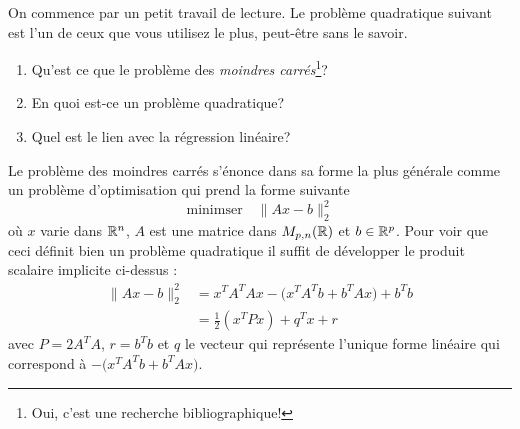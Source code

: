 \documentclass[11pt, a4paper]{article}
\begin{document}
On commence par un petit travail de lecture. Le problème quadratique
suivant est l'un de ceux que vous utilisez le plus, peut-être sans le
savoir.
\begin{question}
  \begin{enumerate}
  \item Qu'est ce que le problème des \textit{moindres carrés}\footnote{Oui,
    c'est une recherche bibliographique!}? 
  \item En quoi est-ce un problème quadratique?
  \item Quel est le lien avec la régression linéaire?
  \end{enumerate}
\end{question}

\begin{solution}
  Le problème des moindres carrés s'énonce dans sa forme la plus
  générale comme un problème d'optimisation qui prend la forme
  suivante
  \[
  \textrm{minimser}\quad \|Ax - b\|_2^2
  \]
  où $x$ varie dans $\mathbb{R}^n$, $A$ est une matrice dans $M_{p, n}(\mathbb{R})$ et
  $b \in \mathbb{R}^p$. Pour voir que ceci définit bien un problème
  quadratique il suffit de développer le produit scalaire implicite
  ci-dessus :
  \begin{align}
    \|Ax - b\|_2^2 & = x^TA^TAx - \big(x^TA^Tb + b^TAx) + b^Tb \\
                   & = \frac{1}{2}(x^TPx) +  q^Tx + r
  \end{align}
  avec $P = 2A^TA$, $r = b^Tb$ et $q$ le vecteur qui représente
  l'unique forme linéaire qui correspond à $- \big(x^TA^Tb + b^TAx)$.


\end{solution}
\end{document}
